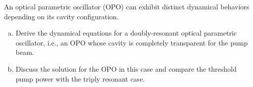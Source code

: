 %


\begin{exercicio}
    An optical parametric oscillator (OPO) can exhibit distinct dynamical behaviors depending on its cavity configuration.
    
    \begin{enumerate}[a)]
        \item Derive the dynamical equations for a doubly-resonant optical parametric oscillator, i.e., an OPO whose cavity is completely transparent for the pump beam.
        \item Discuss the solution for the OPO in this case and compare the threshold pump power with the triply resonant case.
    \end{enumerate}
\end{exercicio}


